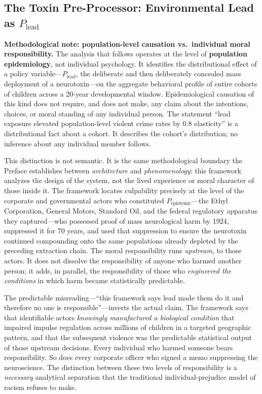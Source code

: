 \subsection{The Toxin Pre-Processor: Environmental Lead as \texorpdfstring{$P_{\text{lead}}$}{P\_lead}}

\textbf{Methodological note: population-level causation vs.\ individual moral responsibility.}
The analysis that follows operates at the level of \textbf{population epidemiology}, not individual psychology. It identifies the distributional effect of a policy variable---$P_{\text{lead}}$, the deliberate and then deliberately concealed mass deployment of a neurotoxin---on the aggregate behavioral profile of entire cohorts of children across a 20-year developmental window. Epidemiological causation of this kind does not require, and does not make, any claim about the intentions, choices, or moral standing of any individual person. The statement ``lead exposure elevated population-level violent crime rates by 0.8 elasticity'' is a distributional fact about a cohort. It describes the cohort's distribution; no inference about any individual member follows.

This distinction is not semantic. It is the same methodological boundary the Preface establishes between \textit{architecture} and \textit{phenomenology}: this framework analyzes the design of the system, not the lived experience or moral character of those inside it. The framework locates culpability precisely at the level of the corporate and governmental actors who constituted $P_{\text{epistemic}}$---the Ethyl Corporation, General Motors, Standard Oil, and the federal regulatory apparatus they captured---who possessed proof of mass neurological harm by 1924, suppressed it for 70 years, and used that suppression to ensure the neurotoxin continued compounding onto the same populations already depleted by the preceding extraction chain. The moral responsibility runs \textit{upstream}, to those actors. It does not dissolve the responsibility of anyone who harmed another person; it adds, in parallel, the responsibility of those who \textit{engineered the conditions} in which harm became statistically predictable.

The predictable misreading---``this framework says lead made them do it and therefore no one is responsible''---inverts the actual claim. The framework says that identifiable actors \textit{knowingly manufactured a biological condition} that impaired impulse regulation across millions of children in a targeted geographic pattern, and that the subsequent violence was the predictable statistical output of those upstream decisions. Every individual who harmed someone bears responsibility. So does every corporate officer who signed a memo suppressing the neuroscience. The distinction between these two levels of responsibility is a \textit{necessary} analytical separation that the traditional individual-prejudice model of racism refuses to make.

